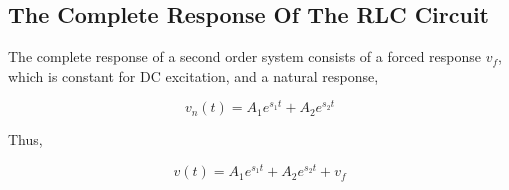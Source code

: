 \documentclass[11pt]{article}
\numberwithin{equation}{section}
\begin{document}
\begin{flushleft}
\color{blue}
\subsection{The Complete Response Of The RLC Circuit}
\color{black}

The complete response of  a second order system consists of a forced response $v_f$, which is constant for DC excitation, and a natural response,

\begin{equation*}
	v_n(t) = A_1e^{s_1t} + A_2e^{s_2t}
\end{equation*}

Thus, 

\begin{equation*}
	v(t) = A_1e^{s_1t} + A_2e^{s_2t} + v_f
\end{equation*}

\end{flushleft}
\end{document}
